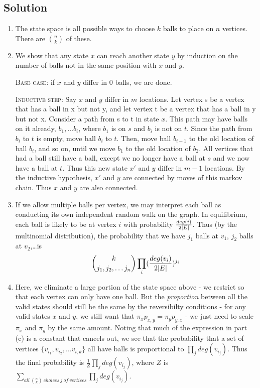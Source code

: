 \documentclass{article}
\DeclarePairedDelimiter\abs{\lvert}{\rvert}%
\begin{document}
\subsection*{Solution}
  \begin{enumerate}
    \item The state space is all possible ways to choose $k$ balls to place on
      $n$ vertices. There are $\binom{n}{k}$ of these.
    \item We show that any state $x$ can reach another state $y$ by
      induction on the number of balls not in the same position with $x$ and
      $y$.

      \vspace{2mm}
      
      \textsc{Base case:} if $x$ and $y$ differ in $0$ balls, we are done.

        \vspace{2mm}
      \textsc{Inductive step:} Say $x$ and $y$ differ in $m$ locations. Let vertex s be
      a vertex that has a ball in x but not y, and let vertex t be a vertex
      that has a ball in y but not x.
      Consider a path from s to t in state $x$.  This path may have balls on
      it already, $b_1, \ldots b_i$, where $b_1$ is on $s$ and $b_i$ is not
      on $t$. Since the path from $b_i$ to $t$ is empty, move ball $b_i$ to
      $t$. Then, move ball $b_{i-1}$ to the old location of ball $b_i$, and so
      on, until we move $b_1$ to the old location of $b_2$. All vertices that
      had a ball still have a ball, except we no longer have a ball at $s$ and
      we now have a ball at $t$. Thus this new state $x'$ and $y$ differ in
      $m-1$ locations. By the inductive hypothesis, $x'$ and $y$ are
      connected by moves of this markov chain. Thus $x$ and $y$ are also
      connected.
    \item If we allow multiple balls per vertex, we may interpret each ball as
      conducting its own independent random walk on the graph. In equilibrium,
      each ball is likely to be at vertex $i$ with probability
      $\frac{deg(i)}{2\abs{E}}$. Thus (by the multinomial distribution), the
      probability that we have $j_1$ balls at $v_1$, $j_2$ balls at
      $v_2$,\ldots is
      \[ {\binom{k}{j_1, j_2, \ldots j_n}} \prod_i
      (\frac{deg(v_i)}{2\abs{E}})^{j_i}\]
    \item Here, we eliminate a large portion of the state space above - we
      restrict so that each vertex can only have one ball. But the
      \emph{proportion} between all the valid states should still be the same
      by the reversibilty conditions - for any valid states $x$ and $y$,
      we still want that $\pi_x p_{x,y} = \pi_y p_{y,x}$ - we just need to
      scale $\pi_x$ and $\pi_y$ by the same amount.
      Noting that much of the expression in part (c) is a constant that
      cancels out, we see that the probability that a set of vertices
      $\{v_{i_1}, v_{i_2}, \ldots v_{i,k}\}$ all have balls is proportional
      to $\prod_j deg(v_{i_j})$. Thus the final probability is
      $\frac{1}{Z}\prod_j deg(v_{i_j})$, where $Z$ is $\sum_{all\ {\binom{n}{k}}\
      choices\ j\ of\ vertices} \prod_j deg(v_{i_j})$.
  \end{enumerate}
\end{document}
